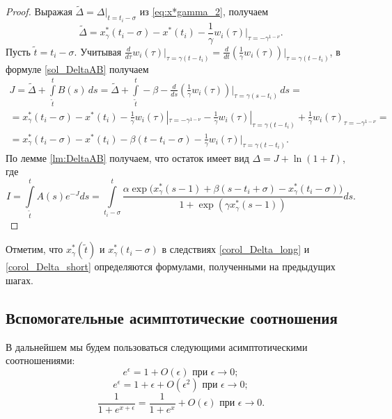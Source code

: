 %
\begin{proof}
	Выражая $\tilde{\Delta} = \Delta|_{t = t_i - \sigma}$ из \eqref{eq:x*gamma_2}, получаем
\[
	\tilde{\Delta} = x^*_{\gamma}(t_i - \sigma) - x^*(t_i) - \frac{1}{\gamma} w_i(\tau)|_{\tau = -\gamma^{1-\nu}}.
\]
Пусть $\tilde{t} = t_i - \sigma$. Учитывая $\frac{d}{d\tau} w_i(\tau)|_{\tau = \gamma(t - t_i)} = \frac{d}{dt} \left(\frac{1}{\gamma}w_i(\tau)\right)\big|_{\tau = \gamma(t - t_i)}$, в формуле \eqref{sol_DeltaAB} получаем
\begin{multline*}
	J = \tilde{\Delta} + \int\limits_{\tilde{t}}^{t} B(s)\,ds = \tilde{\Delta} + \int\limits_{\tilde{t}}^{t} -\beta - \frac{d}{ds} \left(\frac{1}{\gamma}w_i(\tau)\right)\big|_{\tau = \gamma(s - t_i)} \,ds =\\= x^*_{\gamma}(t_i - \sigma) - x^*(t_i) - \frac{1}{\gamma} w_i(\tau)|_{\tau = -\gamma^{1-\nu}} - \frac{1}{\gamma}w_i(\tau)|_{\tau = \gamma(t - t_i)} + \frac{1}{\gamma}w_i(\tau)_{\tau = -\gamma^{1 - \nu}} = \\
	= x^*_{\gamma}(t_i - \sigma) - x^*(t_i) - \beta(t - t_i - \sigma) - \frac{1}{\gamma} w_i(\tau)|_{\tau = \gamma(t - t_i)}.
\end{multline*}
%
По лемме \ref{lm:DeltaAB} получаем, что остаток имеет вид $\Delta = J + \ln(1 + I)$, где 
\[
I = \int\limits_{\tilde{t}}^{t}A(s) e^{-J} ds = \int\limits_{t_i-\sigma}^{t}\frac{\alpha\exp\big(x_{\gamma}^*(s-1)+\beta(s-t_i+\sigma)-x_{\gamma}^*(t_i-\sigma)\big)}{1+\exp(\gamma x_{\gamma}^*(s-1))}ds.
\]
\end{proof}
%
Отметим, что $x_{\gamma}^*(\tilde{t})$ и $x_{\gamma}^*(t_i-\sigma)$ в следствиях \ref{corol_Delta_long} и \ref{corol_Delta_short} определяются формулами, полученными на предыдущих шагах.

\subsection{Вспомогательные асимптотические соотношения}

В дальнейшем мы будем пользоваться следующими асимптотическими соотношениями:
\begin{equation}
\label{eq:exp_const}
	e^{\epsilon} = 1 + O(\epsilon) \text{ при } \epsilon \to 0;
\end{equation}
\begin{equation}
\label{eq:exp_linear}
	e^{\epsilon} = 1 + \epsilon + O(\epsilon^2) \text{ при } \epsilon \to 0;
\end{equation}
\begin{equation}
\label{eq:exp_frac}
	\dfrac{1}{1 + e^{x + \epsilon}} = \frac{1}{1 + e^x} + O(\epsilon) \text{ при } \epsilon \to 0.
\end{equation}

